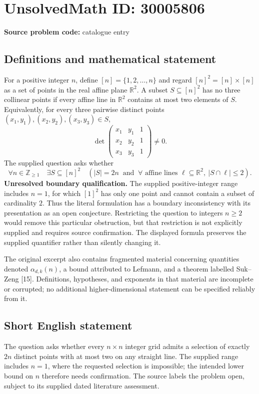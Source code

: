 \documentclass[11pt]{article}
\newcommand{\Z}{\mathbb{Z}}
\newcommand{\R}{\mathbb{R}}
\begin{document}
\section*{UnsolvedMath ID: 30005806}
\textbf{Source problem code:} catalogue entry
\subsection{Definitions and mathematical statement}
For a positive integer \(n\), define \([n]=\{1,2,\ldots,n\}\) and regard \([n]^2=[n]\times[n]\) as a set of points in the real affine plane \(\R^2\). A subset \(S\subseteq[n]^2\) has no three collinear points if every affine line in \(\R^2\) contains at most two elements of \(S\). Equivalently, for every three pairwise distinct points \((x_1,y_1),(x_2,y_2),(x_3,y_3)\in S\),
\[
\det\begin{pmatrix}
x_1&y_1&1\\
x_2&y_2&1\\
x_3&y_3&1
\end{pmatrix}\ne0.
\]
The supplied question asks whether
\[
\forall n\in\Z_{\ge1}\quad\exists S\subseteq[n]^2\quad
\left(|S|=2n\ \text{ and }\ \forall\text{ affine lines }\ell\subseteq\R^2,\ |S\cap\ell|\le2\right).
\]
\textbf{Unresolved boundary qualification.} The supplied positive-integer range includes \(n=1\), for which \([1]^2\) has only one point and cannot contain a subset of cardinality \(2\). Thus the literal formulation has a boundary inconsistency with its presentation as an open conjecture. Restricting the question to integers \(n\ge2\) would remove this particular obstruction, but that restriction is not explicitly supplied and requires source confirmation. The displayed formula preserves the supplied quantifier rather than silently changing it.

The original excerpt also contains fragmented material concerning quantities denoted \(\alpha_{d,k}(n)\), a bound attributed to Lefmann, and a theorem labelled Suk--Zeng [15]. Definitions, hypotheses, and exponents in that material are incomplete or corrupted; no additional higher-dimensional statement can be specified reliably from it.
\subsection{Short English statement}
The question asks whether every \(n\times n\) integer grid admits a selection of exactly \(2n\) distinct points with at most two on any straight line. The supplied range includes \(n=1\), where the requested selection is impossible; the intended lower bound on \(n\) therefore needs confirmation. The source labels the problem open, subject to its supplied dated literature assessment.
\end{document}
